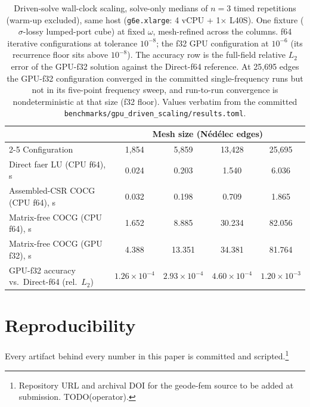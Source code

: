 \documentclass{anvil-paper}
\begin{document}
\begin{table}[t]
  \centering
  \caption{Driven-solve wall-clock scaling, solve-only medians of $n=3$
  timed repetitions (warm-up excluded), same host (\texttt{g6e.xlarge}:
  4 vCPU + 1$\times$ L40S). One fixture ($\sigma$-lossy lumped-port
  cube) at fixed $\omega$, mesh-refined across the columns. f64
  iterative configurations at tolerance $10^{-8}$; the f32 GPU
  configuration at $10^{-6}$ (its recurrence floor sits above
  $10^{-8}$). The accuracy row is the full-field relative $L_2$ error of
  the GPU-f32 solution against the Direct-f64 reference. At 25{,}695
  edges the GPU-f32 configuration converged in the committed
  single-frequency runs but not in its five-point frequency sweep, and
  run-to-run convergence is nondeterministic at that size (f32 floor).
  Values verbatim from the committed
  \texttt{benchmarks/gpu\_driven\_scaling/results.toml}.}
  \label{tab:gpu}
  \small
  \setlength{\tabcolsep}{5pt}
  \begin{tabular}{@{}lcccc@{}}
    \toprule
    & \multicolumn{4}{c}{Mesh size (N\'ed\'elec edges)} \\
    \cmidrule(l){2-5}
    Configuration & 1{,}854 & 5{,}859 & 13{,}428 & 25{,}695 \\
    \midrule
    Direct faer LU (CPU f64), s & 0.024 & 0.203 & 1.540 & 6.036 \\
    Assembled-CSR COCG (CPU f64), s & 0.032 & 0.198 & 0.709 & 1.865 \\
    Matrix-free COCG (CPU f64), s & 1.652 & 8.885 & 30.234 & 82.056 \\
    Matrix-free COCG (GPU f32), s & 4.388 & 13.351 & 34.381 & 81.764 \\
    \midrule
    GPU-f32 accuracy vs.\ Direct-f64 (rel.\ $L_2$) &
      $1.26\times10^{-4}$ & $2.93\times10^{-4}$ &
      $4.60\times10^{-4}$ & $1.20\times10^{-3}$ \\
    \bottomrule
  \end{tabular}
\end{table}

\section{Reproducibility}
\label{sec:repro}

Every artifact behind every number in this paper is committed and
scripted.\footnote{Repository URL and archival DOI for the geode-fem
source to be added at submission. TODO(operator).}
\end{document}
